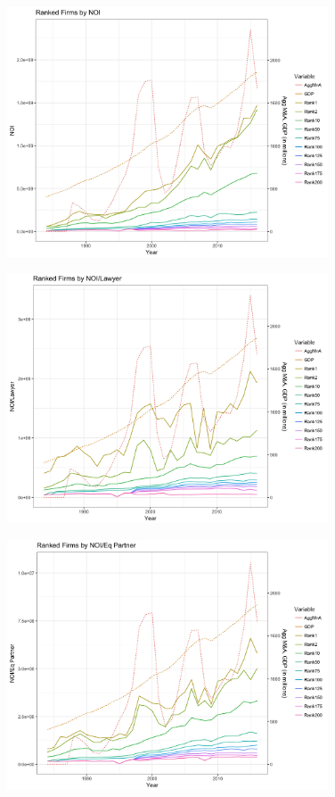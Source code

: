 \documentclass{article}
\begin{document}
\begin{figure}[H]\centering
\includegraphics[width=0.85\textwidth]{../IndivTexOutput/MnAGDP-4.jpg}\end{figure}

\begin{figure}[H]\centering
\includegraphics[width=0.85\textwidth]{../IndivTexOutput/MnAGDP-5.jpg}\end{figure}

\begin{figure}[H]\centering
\includegraphics[width=0.85\textwidth]{../IndivTexOutput/MnAGDP-6.jpg}\end{figure}
\end{document}
